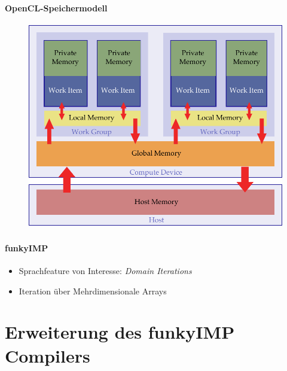 \documentclass{beamer}
\begin{document}
\begin{frame}
	\frametitle{}
	\framesubtitle{OpenCL-Speichermodell}
	\begin{figure}
		\begin{center}
			\includegraphics[width=0.75\linewidth]{../images/memory_hierarchy}
		\end{center}
		\label{fig:theory_memory_hierarchy}
	\end{figure}
\end{frame}

\begin{frame}
	\frametitle{}
	\framesubtitle{funkyIMP}
	\begin{block}{}
		\begin{itemize}
			\item Sprachfeature von Interesse: \emph{Domain Iterations}
			\pause
			\item Iteration über Mehrdimensionale Arrays
		\end{itemize}
	\end{block}
	\begin{exampleblock}{}
		
	\end{exampleblock}
\end{frame}

\section{Erweiterung des funkyIMP Compilers}
\label{sect:extensions}
\end{document}

